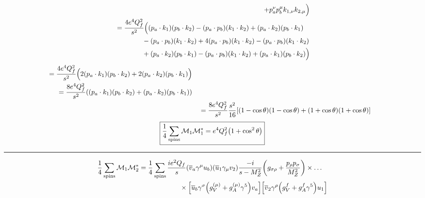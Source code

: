 \documentclass[12 pt,draft]{article}
\renewcommand{\b}[1]{\overline{#1}}
\begin{document}
\begin{problem}[ $\mu\b{\mu}\rightarrow f\b{f}$]
\begin{align}
\begin{split}
					+p_a^{\nu}p_b^{\mu}k_{1,\nu}k_{2,\mu}
				\Big)
			\end{split}
			\\
			\begin{split}
				&=\frac{4e^4Q_f^2}{s^2}
				\Big(
					\qty(p_a\cdot k_1)\qty(p_b\cdot k_2)
					-\qty(p_a\cdot p_b)\qty(k_1\cdot k_2)
					+(p_a\cdot k_2) \qty(p_b\cdot k_1)
					\\&\qquad\qquad
					-\qty(p_a\cdot p_b)\qty(k_1\cdot k_2)
					+4\qty(p_a\cdot p_b)\qty(k_1\cdot k_2)
					-\qty(p_a\cdot p_b)\qty(k_1\cdot k_2)
					\\&\qquad\qquad
					+\qty(p_a\cdot k_2)\qty(p_b\cdot k_1)
					-\qty(p_a\cdot p_b)\qty(k_1\cdot k_2)
					+\qty(p_a\cdot k_1)\qty(p_b\cdot k_2)
				\Big)
			\end{split}
		\end{align}
		\begin{align}
			\begin{split}
				&=\frac{4e^4Q_f^2}{s^2}
				\Big(
					2\qty(p_a\cdot k_1) \qty(p_b\cdot k_2)
					+2\qty(p_a\cdot k_2) \qty(p_b\cdot k_1)
				\Big)
			\end{split}
			\\
			\begin{split}
				&=\frac{8e^4Q_f^2}{s^2}
				\qty(
					\qty(p_a\cdot k_1) \qty(p_b\cdot k_2)
					+\qty(p_a\cdot k_2) \qty(p_b\cdot k_1)
				)
			\end{split}
			\\
			&=\frac{8e^4Q_f^2}{s^2}\frac{s^2}{16}\qty[\qty(1-\cos\theta)\qty(1-\cos\theta)+\qty(1+\cos\theta)\qty(1+\cos\theta)]
		\end{align}
		\begin{align}
			\boxed{\oo{4}\sum_\text{spins}\mathcal{M}_1\mathcal{M}_1^*=e^4Q_f^2\qty(1+\cos^2\theta)}
		\end{align}
	\hrule
		\begin{align}
			\begin{split}
				\oo{4}\sum_\text{spins}\mathcal{M}_1\mathcal{M}_2^*
				&=\oo{4}\sum_\text{spins}
				\frac{ie^2Q_f}{s}
				\qty(\b{v}_a\gamma^\mu u_b)
				\qty(\b{u}_1\gamma_\mu v_2)
				\frac{-i}{s-M_Z^2}\qty(g_{\sigma\rho}+\frac{p_\rho p_\sigma}{M_Z^2})
				\times\ldots\\&\qquad\qquad\qquad\times
				\qty[\b{u}_b\gamma^\sigma\qty(g_V^{(\mu)}+g_A^{(\mu)}\gamma^5)v_a]
				\qty[\b{v}_2\gamma^\rho\qty(g_V^f+g_A^f\gamma^5)u_1]
			\end{split}
			\\
			\begin{split}

\end{split}
\end{align}
\end{problem}
\end{document}
